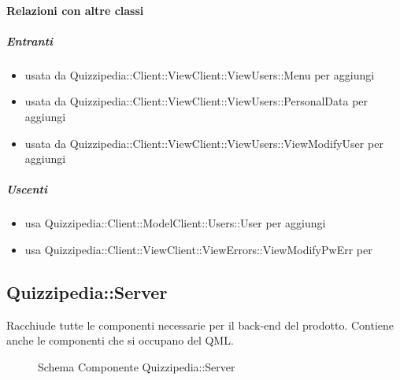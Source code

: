 \paragraph{Relazioni con altre classi}
\subparagraph{Entranti}
\begin{itemize}
\item usata da Quizzipedia::Client::ViewClient::ViewUsers::Menu per aggiungi
\item usata da Quizzipedia::Client::ViewClient::ViewUsers::PersonalData per aggiungi
\item usata da Quizzipedia::Client::ViewClient::ViewUsers::ViewModifyUser per aggiungi
\end{itemize}
\subparagraph{Uscenti}
\begin{itemize}
\item usa Quizzipedia::Client::ModelClient::Users::User per aggiungi
\item usa Quizzipedia::Client::ViewClient::ViewErrors::ViewModifyPwErr per 
\end{itemize}
\subsection{Quizzipedia::Server}
Racchiude tutte le componenti necessarie per il back-end del prodotto. Contiene anche le componenti che si occupano del QML.
\begin{figure}[H]
\centering
\noindent{}
\caption[Schema Componente Server]{Schema Componente Quizzipedia::Server}
\end{figure}
